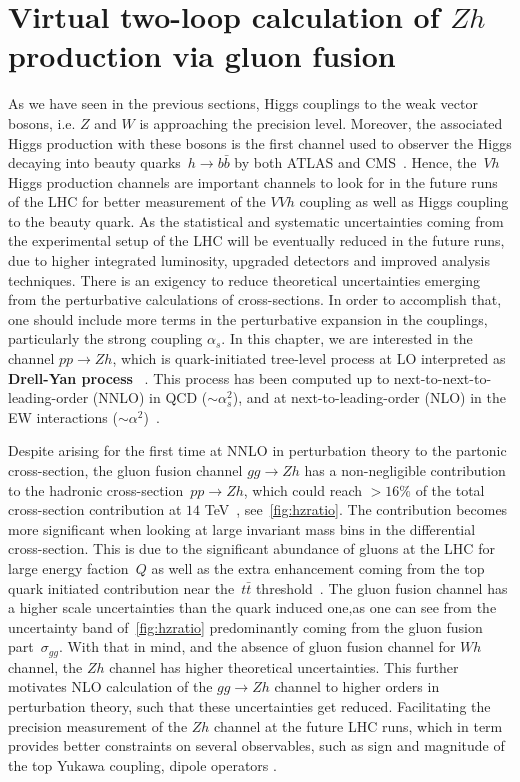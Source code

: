 \chapter{ Virtual two-loop calculation of  $Zh$ production via gluon fusion}\label{chap:hz}
\par As we have seen in the previous sections, Higgs couplings to the weak vector bosons, i.e. $Z$ and $W$ is approaching the precision level. Moreover, the associated Higgs production with these bosons is the first channel used to observer the Higgs decaying into beauty quarks~$h \rightarrow b \bar{b}$ by both ATLAS and CMS~\cite{Aaboud:2018zhk, Sirunyan:2018kst}. Hence, the~$Vh$ Higgs production channels are important channels to look for in the future runs of the LHC for better measurement of the $VVh$ coupling as well as Higgs coupling to the beauty quark. As the statistical and systematic uncertainties coming from the experimental setup of the LHC will be eventually reduced in the future runs, due to higher integrated luminosity,  upgraded detectors and improved analysis techniques. There is an exigency to reduce theoretical uncertainties emerging from the perturbative calculations of  cross-sections. In order to accomplish that, one should include more terms in the perturbative expansion in the couplings, particularly the strong coupling $\alpha_s$. In this chapter, we are interested in the channel $pp\to Zh$, which is quark-initiated tree-level process at LO interpreted as \textbf{Drell-Yan process}~ \cite{Han:1991ia,Brein:2003wg}. This process has been computed up to next-to-next-to-leading-order (NNLO) in QCD ($\sim \alpha_s^2$), and
at next-to-leading-order (NLO) in the EW interactions ($\sim \alpha^2 $)~\cite{Amoroso:2020lgh}.
\par Despite arising for the first time at NNLO in perturbation theory to the partonic cross-section, the gluon fusion channel $g g \rightarrow Zh$ has a non-negligible contribution to the hadronic cross-section~$pp\to Zh$, which could reach $>16\%$ of the total cross-section contribution at $14$ TeV~\cite{Cepeda:2019klc}, see~\autoref{fig:hzratio}. The contribution becomes more significant when looking at large invariant mass bins in the differential cross-section. This is due to the significant abundance of gluons at the LHC for large energy faction~$Q$ as well as the extra enhancement coming from the top quark initiated contribution near the~$t\bar t$ threshold~\cite{Englert:2013vua}.  The gluon fusion channel has a higher scale uncertainties than the quark induced one,as one can see from the uncertainty band of~\autoref{fig:hzratio} predominantly coming from the gluon fusion part~$\sigma_{gg}$.  With that in mind, and the absence of gluon fusion channel for $Wh$ channel, the $Zh$ channel has higher theoretical uncertainties. This  further motivates NLO calculation of the  $g g \rightarrow Z h$ channel to higher orders in perturbation theory,  such that these uncertainties get reduced. Facilitating the precision measurement of the $Zh$ channel at the future LHC runs, which in term provides better constraints on several observables, such as sign and magnitude of the top Yukawa coupling,  dipole operators \cite{Englert:2016hvy}.
